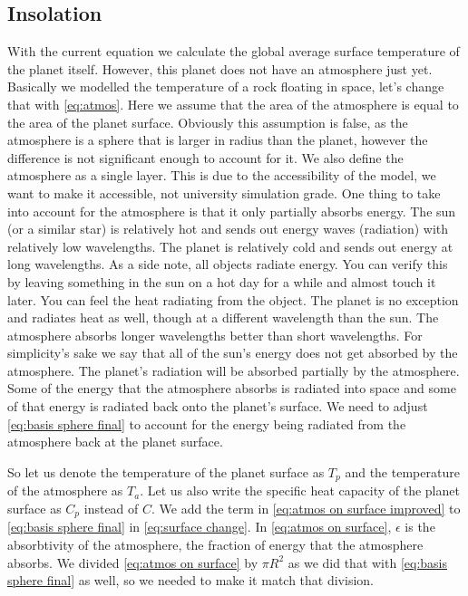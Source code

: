 \subsection{Insolation}

With the current equation we calculate the global average surface temperature of the planet itself. However, this planet does not have an atmosphere just yet. Basically we modelled the 
temperature of a rock floating in space, let's change that with \autoref{eq:atmos}. Here we assume that the area of the atmosphere is equal to the area of the planet surface. Obviously
this assumption is false, as the atmosphere is a sphere that is larger in radius than the planet, however the difference is not significant enough to account for it. We also define the
atmosphere as a single layer. This is due to the accessibility of the model, we want to make it accessible, not university simulation grade. One thing to take into account for the 
atmosphere is that it only partially absorbs energy. The sun (or a similar star) is relatively hot and sends out energy waves (radiation) with relatively low wavelengths. The planet is 
relatively cold and sends out energy at long wavelengths. As a side note, all objects radiate energy. You can verify this by leaving something in the sun on a hot day for a while and 
almost touch it later. You can feel the heat radiating from the object. The planet is no exception and radiates heat as well, though at a different wavelength than the sun. The 
atmosphere absorbs longer wavelengths better than short wavelengths. For simplicity's sake we say that all of the sun's energy does not get absorbed by the atmosphere. The planet's 
radiation will be absorbed partially by the atmosphere. Some of the energy that the atmosphere absorbs is radiated into space and some of that energy is radiated back onto the planet's 
surface. We need to adjust \autoref{eq:basis sphere final} to account for the energy being radiated from the atmosphere back at the planet surface.

So let us denote the temperature of the planet surface as $T_p$ and the temperature of the atmosphere as $T_a$. Let us also write the specific heat capacity of the planet surface as $C_p$ 
instead of $C$. We add the term in \autoref{eq:atmos on surface improved} to \autoref{eq:basis sphere final} in \autoref{eq:surface change}. In \autoref{eq:atmos on surface}, $\epsilon$ is the 
absorbtivity of the atmosphere, the fraction of energy that the atmosphere absorbs. We divided \autoref{eq:atmos on surface} by $\pi R^2$ as we did that with \autoref{eq:basis sphere final} as 
well, so we needed to make it match that division.

